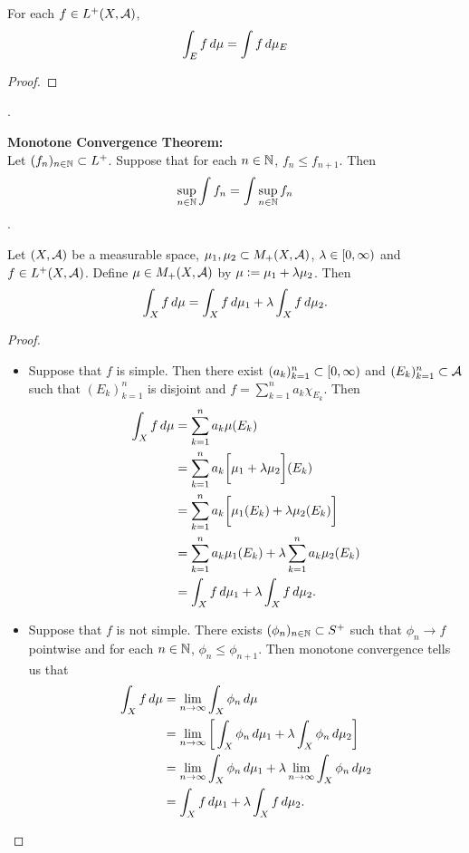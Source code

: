 \documentclass{book}
\begin{document}
	\begin{ex} 
		For each $f \in L^+(X, \mathcal{A})$, 
		$$\int_E f \, d \mu = \int f \, d \mu_E$$ 
	\end{ex}

	\begin{proof}
	\end{proof}

	. 
	
	
	\begin{thm}  \textbf{Monotone Convergence Theorem:} \\
		Let $(f_n)_{n \in \mathbb{N}} \subset L^+$. Suppose that for each $n \in \mathbb{N}$, $f_n \leq f_{n+1}$. Then $$\sup_{n \in \mathbb{N}} \int f_n = \int \sup_{n \in \mathbb{N}} f_n$$.
	\end{thm}

	\begin{ex}  
		Let $(X, \mathcal{A})$ be a measurable space, $\mu_1, \mu_2 \subset M_+(X, \mathcal{A})$, $\lambda \in [0,\infty)$ and $f \in L^+(X, \mathcal{A})$. Define $\mu \in M_+(X, \mathcal{A})$ by $\mu \vcentcolon= \mu_1 + \lambda \mu_2$. Then 
		$$\int_X f \, d \mu = \int_X f \, d \mu_1 + \lambda \int_X f \, d \mu_2.$$  
	\end{ex}

	\begin{proof}\
		\begin{itemize}
			\item Suppose that $f$ is simple. Then there exist $(a_k)_{k=1}^n \subset [0,\infty)$ and $(E_k)_{k=1}^n \subset \mathcal{A}$ such that $(E_k)_{k=1}^n $ is disjoint and $f = \sum\limits_{k =1}^n a_k \chi_{E_k}$. Then 
			\begin{align*}
				\int_X f \, d \mu
				& = \sum \limits_{k =1}^n a_k \mu(E_k) \\
				& = \sum \limits_{k =1}^n a_k \bigg[ \mu_1 + \lambda \mu_2 \bigg](E_k) \\
				& = \sum \limits_{k =1}^n a_k \bigg[ \mu_1(E_k) + \lambda \mu_2(E_k) \bigg] \\
				& = \sum \limits_{k =1}^n a_k\mu_1(E_k) + \lambda \sum \limits_{k =1}^n a_k \mu_2(E_k) \\
				& = \int_X f \, d \mu_1 + \lambda \int_X f \, d \mu_2.
			\end{align*}
			\item Suppose that $f$ is not simple. There exists $(\phi_n)_{n \in \mathbb{N}} \subset S^+$ such that $\phi_n \rightarrow f$ pointwise and for each $n \in \mathbb{N}$, $\phi_n \leq \phi_{n+1}$. Then monotone convergence tells us that 
			\begin{align*}
				\int_X f \, d \mu 
				& = \lim \limits_{n \rightarrow \infty} \int_X \phi_n \, d \mu \\
				& = \lim \limits_{n \rightarrow \infty} \bigg[ \int_X \phi_n \, d \mu_1 + \lambda \int_X \phi_n \, d \mu_2  \bigg] \\
				& = \lim \limits_{n \rightarrow \infty} \int_X \phi_n \, d \mu_1 + \lambda \lim \limits_{n \rightarrow \infty} \int_X \phi_n \, d \mu_2 \\
				& = \int_X f \, d \mu_1 + \lambda \int_X f \, d \mu_2.
			\end{align*}
		\end{itemize}
	\end{proof}
	
\end{document}
